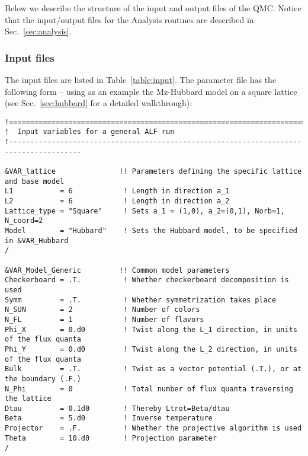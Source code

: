 Below we describe the structure of the input and output files of the QMC. Notice that the input/output files for the Analysis routines are described in Sec.~\ref{sec:analysis}.

\subsubsection{Input files}\label{sec:input}
%

The input files are listed in Table~\ref{table:input}. 
The parameter file  has the following form --
using as an example  the Mz-Hubbard model on a square lattice (see Sec.~\ref{sec:hubbard} for a detailed walkthrough):
%
\begin{lstlisting}[style=fortran,escapechar=\#,breaklines=true]
!=======================================================================================
!  Input variables for a general ALF run
!---------------------------------------------------------------------------------------

&VAR_lattice               !! Parameters defining the specific lattice and base model
L1           = 6            ! Length in direction a_1
L2           = 6            ! Length in direction a_2
Lattice_type = "Square"     ! Sets a_1 = (1,0), a_2=(0,1), Norb=1, N_coord=2
Model        = "Hubbard"    ! Sets the Hubbard model, to be specified in &VAR_Hubbard
/

&VAR_Model_Generic         !! Common model parameters
Checkerboard = .T.          ! Whether checkerboard decomposition is used
Symm         = .T.          ! Whether symmetrization takes place
N_SUN        = 2            ! Number of colors
N_FL         = 1            ! Number of flavors
Phi_X        = 0.d0         ! Twist along the L_1 direction, in units of the flux quanta
Phi_Y        = 0.d0         ! Twist along the L_2 direction, in units of the flux quanta
Bulk         = .T.          ! Twist as a vector potential (.T.), or at the boundary (.F.)
N_Phi        = 0            ! Total number of flux quanta traversing the lattice
Dtau         = 0.1d0        ! Thereby Ltrot=Beta/dtau
Beta         = 5.d0         ! Inverse temperature
Projector    = .F.          ! Whether the projective algorithm is used
Theta        = 10.d0        ! Projection parameter
/


\end{lstlisting}

